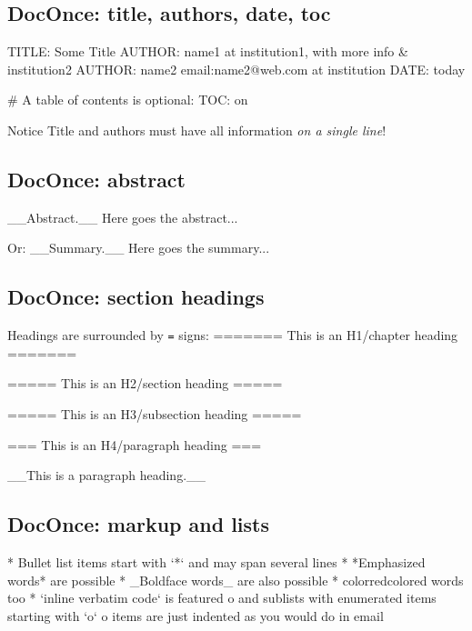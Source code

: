 \documentclass[%
oneside,                 %
final,                   %
10pt]{article}
\begin{document}
\subsection{DocOnce: title, authors, date, toc}
\bccq
TITLE: Some Title
AUTHOR: name1 at institution1, with more info & institution2
AUTHOR: name2 email:name2@web.com at institution
DATE: today

# A table of contents is optional:
TOC: on

\eccq

\begin{block}{Notice}
Title and authors must have all information \emph{on a single line}!
\end{block}
\subsection{DocOnce: abstract}
\bccq
__Abstract.__
Here goes the abstract...

\eccq

Or:
\bccq
__Summary.__
Here goes the summary...

\eccq

\subsection{DocOnce: section headings}
Headings are surrounded by \texttt{=} signs:
\bccq
======= This is an H1/chapter heading =======

===== This is an H2/section heading =====

===== This is an H3/subsection heading =====

=== This is an H4/paragraph heading ===

__This is a paragraph heading.__

\eccq

\subsection{DocOnce: markup and lists}
\bccq
 * Bullet list items start with `*`
   and may span several lines
 * *Emphasized words* are possible
 * _Boldface words_ are also possible
 * color{red}{colored words} too
 * `inline verbatim code` is featured
   o and sublists with enumerated items starting with `o`
   o items are just indented as you would do in email

\eccq
\end{document}
